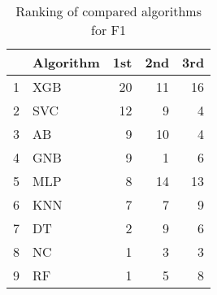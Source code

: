 \begin{table}
\footnotesize
\caption{Ranking of compared algorithms for F1}
\label{tab:places F1}
\begin{tabular}{llrrr}
\hline
 & Algorithm & 1st & 2nd & 3rd \\
\hline
1 & XGB & 20 & 11 & 16 \\
2 & SVC & 12 & 9 & 4 \\
3 & AB & 9 & 10 & 4 \\
4 & GNB & 9 & 1 & 6 \\
5 & MLP & 8 & 14 & 13 \\
6 & KNN & 7 & 7 & 9 \\
7 & DT & 2 & 9 & 6 \\
8 & NC & 1 & 3 & 3 \\
9 & RF & 1 & 5 & 8 \\
\hline
\end{tabular}
\end{table}
